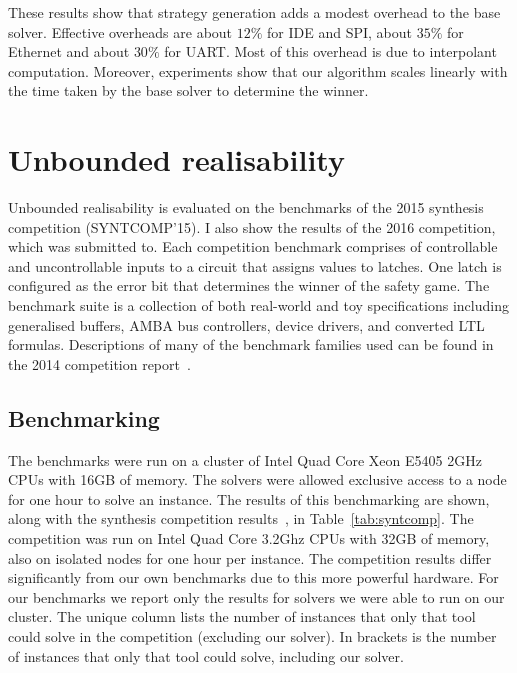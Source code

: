 These results show that strategy generation adds a modest overhead to the base solver.  Effective overheads are about $12\%$ for IDE and SPI, about $35\%$ for Ethernet and about $30\%$ for UART.  Most of this overhead is due to interpolant computation.  Moreover, experiments show that our algorithm scales linearly with the time taken by the base solver to determine the winner.  


\section{Unbounded realisability}

Unbounded realisability is evaluated on the benchmarks of the 2015 synthesis competition (SYNTCOMP'15). I also show the results of the 2016 competition, which \termitesat was submitted to. Each competition benchmark comprises of controllable and uncontrollable inputs to a circuit that assigns values to latches. One latch is configured as the error bit that determines the winner of the safety game. The benchmark suite is a collection of both real-world and toy specifications including generalised buffers, AMBA bus controllers, device drivers, and converted LTL formulas.  Descriptions of many of the benchmark families used can be found in the 2014 competition report~\cite{Jacobs15}. 

\subsection{Benchmarking}

The benchmarks were run on a cluster of Intel Quad Core Xeon E5405 2GHz CPUs with 16GB of memory.  The solvers were allowed exclusive access to a node for one hour to solve an instance.  The results of this benchmarking are shown, along with the synthesis competition results~\cite{syntcompedacc}, in Table~\ref{tab:syntcomp}. The competition was run on Intel Quad Core 3.2Ghz CPUs with 32GB of memory, also on isolated nodes for one hour per instance. The competition results differ significantly from our own benchmarks due to this more powerful hardware.  For our benchmarks we report only the results for solvers we were able to run on our cluster. The unique column lists the number of instances that only that tool could solve in the competition (excluding our solver). In brackets is the number of instances that only that tool could solve, including our solver.

